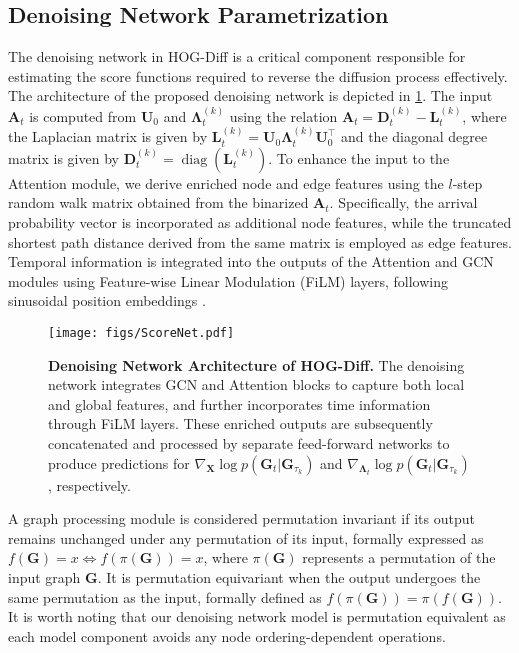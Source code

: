 \subsection{Denoising Network Parametrization}
\label{app:denoising-model}

The denoising network in HOG-Diff is a critical component responsible for estimating the score functions required to reverse the diffusion process effectively. 
The architecture of the proposed denoising network is depicted in \cref{fig:denoising-model}.
The input $\bm{A}_t$ is computed from $\bm{U}_0$ and $\bm{\Lambda}_t^{(k)}$ using the relation  $\bm{A}_t=\bm{D}_t^{(k)}-\bm{L}^{(k)}_t$, where the Laplacian matrix is given by $\bm{L}^{(k)}_t=\bm{U}_0 \bm{\Lambda}_t^{(k)}\bm{U}_0^\top$ and the diagonal degree matrix is given by $\bm{D}_t^{(k)}=\operatorname{diag}\left(\bm{L}_t^{(k)}\right)$.
%
To enhance the input to the Attention module, we derive enriched node and edge features using the  $l$-step random walk matrix obtained from the binarized $\bm{A}_t$.
Specifically, the arrival probability vector is incorporated as additional node features, while the truncated shortest path distance derived from the same matrix is employed as edge features.
Temporal information is integrated into the outputs of the Attention and GCN modules using Feature-wise Linear Modulation (FiLM) \cite{Film+AAAI2018} layers, following sinusoidal position embeddings \cite{attention+NeurIPS2017}.



\begin{figure}[t]
\centering
\texttt{[image: figs/ScoreNet.pdf]}
\caption{\textbf{Denoising Network Architecture of HOG-Diff.} 
The denoising network integrates GCN and Attention blocks to capture both local and global features, and further incorporates time information through FiLM layers.
These enriched outputs are subsequently concatenated and processed by separate feed-forward networks to produce predictions for $\nabla_{\bm{X}} \log p(\bm{G}_t|\bm{G}_{\tau_k})$ and $\nabla_{\bm{\Lambda}_t} \log p(\bm{G}_t|\bm{G}_{\tau_k})$, respectively.
}
\label{fig:denoising-model}
\vspace{-4mm}
\end{figure}

A graph processing module is considered permutation invariant if its output remains unchanged under any permutation of its input, formally expressed as $f(\bm{G}) = x \iff f(\pi(\bm{G})) = x$, where $\pi(\bm{G})$ represents a permutation of the input graph $\bm{G}$. It is permutation equivariant when the output undergoes the same permutation as the input, formally defined as $f(\pi(\bm{G})) = \pi(f(\bm{G}))$. 
It is worth noting that our denoising network model is permutation equivalent as each model component avoids any node ordering-dependent operations.




